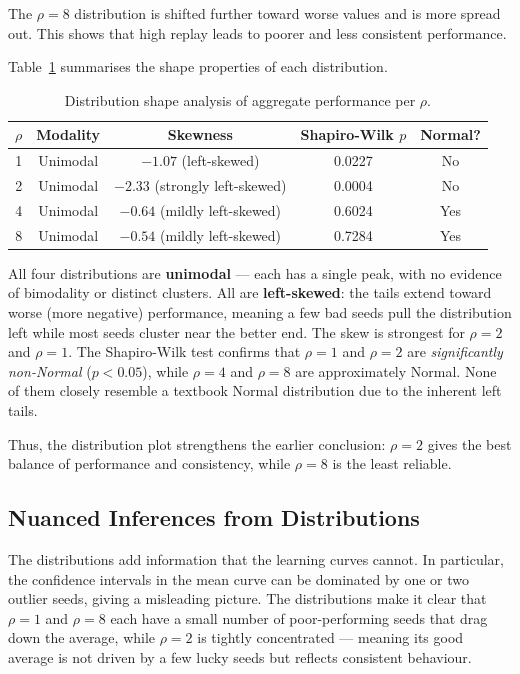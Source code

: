\documentclass[11pt,a4paper]{article}
\begin{document}
The \(\rho=8\) distribution is shifted further toward worse values and is more spread out. This shows that high replay leads to poorer and less consistent performance.

Table~\ref{tab:q4b_shape} summarises the shape properties of each distribution.

\begin{table}[H]
\centering
\caption{Distribution shape analysis of aggregate performance per \(\rho\).}
\label{tab:q4b_shape}
\renewcommand{\arraystretch}{1.2}
\begin{tabular}{ccccc}
\toprule
\(\rho\) & Modality & Skewness & Shapiro-Wilk \(p\) & Normal? \\
\midrule
1 & Unimodal & $-1.07$ (left-skewed) & 0.0227 & No  \\
2 & Unimodal & $-2.33$ (strongly left-skewed) & 0.0004 & No  \\
4 & Unimodal & $-0.64$ (mildly left-skewed) & 0.6024 & Yes \\
8 & Unimodal & $-0.54$ (mildly left-skewed) & 0.7284 & Yes \\
\bottomrule
\end{tabular}
\end{table}

All four distributions are \textbf{unimodal} — each has a single peak, with no evidence of bimodality or distinct clusters. All are \textbf{left-skewed}: the tails extend toward worse (more negative) performance, meaning a few bad seeds pull the distribution left while most seeds cluster near the better end. The skew is strongest for \(\rho=2\) and \(\rho=1\). The Shapiro-Wilk test confirms that \(\rho=1\) and \(\rho=2\) are \emph{significantly non-Normal} (\(p<0.05\)), while \(\rho=4\) and \(\rho=8\) are approximately Normal. None of them closely resemble a textbook Normal distribution due to the inherent left tails.

Thus, the distribution plot strengthens the earlier conclusion: \(\rho=2\) gives the best balance of performance and consistency, while \(\rho=8\) is the least reliable.

\subsection*{Nuanced Inferences from Distributions}

The distributions add information that the learning curves cannot. In particular, the confidence intervals in the mean curve can be dominated by one or two outlier seeds, giving a misleading picture. The distributions make it clear that \(\rho=1\) and \(\rho=8\) each have a small number of poor-performing seeds that drag down the average, while \(\rho=2\) is tightly concentrated — meaning its good average is not driven by a few lucky seeds but reflects consistent behaviour.
\end{document}
